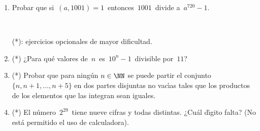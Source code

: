\documentclass[12pt,spanish,makeidx]{amsbook}
\begin{document}
\begin{enumerate}



\item Probar que si \,$(a,1001)=1$\, entonces \,$1001$\, divide a \,$a^{720}-1$.


\smallskip


\


\noindent (*): ejercicios opcionales de mayor dificultad.

\smallskip

\item (*) ¿Para qu\'e valores de \,$n$\, es \,$10^n-1$\, divisible por \,$11$?


\smallskip

\item (*) Probar que para ning\'un $n\in\NN$ se puede partir el conjunto $\{n,n+1,\ldots, n+5\}$ en dos partes
disjuntas no vac\'\i as tales que los productos de los elementos que las integran sean iguales.

\smallskip

\item (*) El n\'umero \,$2^{29}$\, tiene nueve cifras y todas distintas.
¿Cu\'al d\'\i gito falta? (No est\'a permitido el uso de calculadora).



\end{enumerate}
\end{document}
